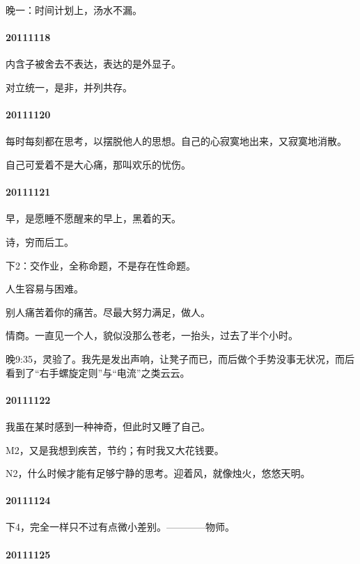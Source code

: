 \documentclass[UTF8]{book}
\begin{document}
晚一：时间计划上，汤水不漏。


\paragraph{20111118}

内含子被舍去不表达，表达的是外显子。

对立统一，是非，并列共存。


\paragraph{20111120}

每时每刻都在思考，以摆脱他人的思想。自己的心寂寞地出来，又寂寞地消散。

自己可爱着不是大心痛，那叫欢乐的忧伤。


\paragraph{20111121}

早，是愿睡不愿醒来的早上，黑着的天。

诗，穷而后工。

下2：交作业，全称命题，不是存在性命题。

人生容易与困难。

别人痛苦着你的痛苦。尽最大努力满足，做人。

情商。一直见一个人，貌似没那么苍老，一抬头，过去了半个小时。

晚9:35，灵验了。我先是发出声响，让凳子而已，而后做个手势没事无状况，而后看到了“右手螺旋定则”与“电流”之类云云。


\paragraph{20111122}

我虽在某时感到一种神奇，但此时又睡了自己。

M2，又是我想到疾苦，节约；有时我又大花钱要。

N2，什么时候才能有足够宁静的思考。迎着风，就像烛火，悠悠天明。


\paragraph{20111124}

下4，完全一样只不过有点微小差别。————物师。


\paragraph{20111125}
\end{document}
